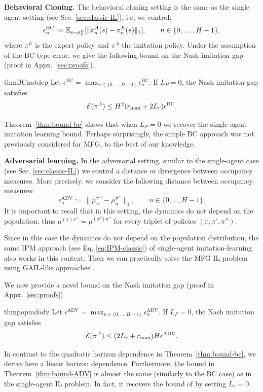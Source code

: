 \documentclass{article}
\begin{document}
\textbf{Behavioral Cloning.}  The behavioral cloning setting is the same as the single agent setting (see Sec. \ref{sec:classic-IL}), i.e, we control:
\begin{equation}
\label{eq:BC-MFG}
    \epsilon_n^\mathrm{BC} := \mathbb{E}_{s\sim \rho_n^E}[\|\pi^A_n(s) - \pi^E_n(s)\|_1], \qquad n\in\{0,\dots,H-1\},
\end{equation}
where $\pi^E$ is the expert policy and $\pi^A$ the imitation policy. 
Under the assumption of the BC-type error, we give the following bound on the Nash imitation gap (proof in Appx.~\ref{sec:proofs}).
\begin{restatable}{thm}{BCnotdep}
\label{thm:bound-bc}
    Let $\epsilon^\mathrm{BC} = \max_{n\in\{0, \dots, H-1\}}\epsilon^\mathrm{BC}_n$.
    If $L_P=0$, the Nash imitation gap satisfies %
    \begin{equation}
        \mathcal{E}(\pi^A) \leq H^2(r_\text{max} + 2 L_r) \epsilon^{\mathrm{BC}}.
    \end{equation}
\end{restatable}
Theorem~\ref{thm:bound-bc} shows that when $L_P=0$ we recover the single-agent imitation learning bound.
Perhaps surprisingly, the simple BC approach was not previously considered for MFG, to the best of our knowledge.

\textbf{Adversarial learning.} In the adversarial setting, similar to the single-agent case (see Sec. \ref{sec:classic-IL}) we control a distance or divergence between occupancy measures. 
More precisely, we consider the following distance between occupancy measures: 
\begin{equation}
\label{eq:conc}
    \epsilon_n^\mathrm{ADV} := \|\mu^{\pi^A}_n - \mu^{\pi^E}_n\|_1, \qquad n \in \{0,\dots,H-1\}.
\end{equation}
It is important to recall that in this setting, the dynamics do not depend on the population, thus $\mu^{(\pi)\pi''} = \mu^{(\pi')\pi''}$ for every triplet of policies $(\pi, \pi', \pi'')$. 

Since in this case the dynamics do not depend on the population distribution, the same IPM approach (see Eq. \eqref{eq:IPM-classic}) of single-agent imitation-learning also works in this context. Then we can practically solve the MFG IL problem using GAIL-like approaches \cite{ho2016generative,ghasemipour2020divergence,ke2021imitation,garg2021iq}.

We now provide a novel bound on the Nash imitation gap  (proof in Appx.~\ref{sec:proofs}).
\begin{restatable}{thm}{popindadv}
\label{thm:bound-ADV}
Let $\epsilon^\mathrm{ADV} = \max_{n\in\{0,\dots,H-1\}}\epsilon^\mathrm{ADV}_n$.
If $L_P=0$, the Nash imitation gap satisfies
\begin{equation*}
\mathcal{E}(\pi^A) \le (2L_r +r_{\max}) H \epsilon^\mathrm{ADV}.
\end{equation*}
\end{restatable}
In contrast to the quadratic horizon dependence in Theorem~\ref{thm:bound-bc}, we derive here a linear horizon dependence.
Furthermore, the bound in Theorem~\ref{thm:bound-ADV} is almost the same (similarly to the BC case) as in the single-agent IL problem. 
In fact, it recovers the bound of \cite{xu2020error} by setting $L_r=0$.
\end{document}
